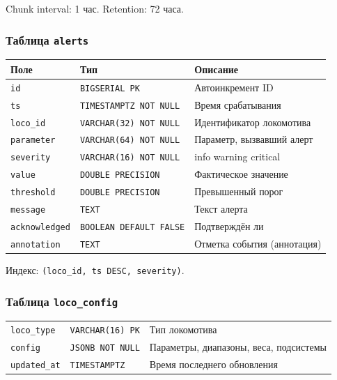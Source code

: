 \documentclass[12pt,a4paper]{article}
\newcommand{\code}[1]{\texttt{#1}}
\begin{document}
\vspace{0.3em}
\noindent Chunk interval: 1 час. Retention: 72 часа.

\subsubsection*{Таблица \code{alerts}}

\begin{tabularx}{\textwidth}{l l X}
\toprule
\textbf{Поле} & \textbf{Тип} & \textbf{Описание} \\
\midrule
\code{id} & \code{BIGSERIAL PK} & Автоинкремент ID \\
\code{ts} & \code{TIMESTAMPTZ NOT NULL} & Время срабатывания \\
\code{loco\_id} & \code{VARCHAR(32) NOT NULL} & Идентификатор локомотива \\
\code{parameter} & \code{VARCHAR(64) NOT NULL} & Параметр, вызвавший алерт \\
\code{severity} & \code{VARCHAR(16) NOT NULL} & info \textbar{} warning \textbar{} critical \\
\code{value} & \code{DOUBLE PRECISION} & Фактическое значение \\
\code{threshold} & \code{DOUBLE PRECISION} & Превышенный порог \\
\code{message} & \code{TEXT} & Текст алерта \\
\code{acknowledged} & \code{BOOLEAN DEFAULT FALSE} & Подтверждён ли \\
\code{annotation} & \code{TEXT} & Отметка события (аннотация) \\
\bottomrule
\end{tabularx}

\vspace{0.3em}
\noindent Индекс: \code{(loco\_id, ts DESC, severity)}.

\subsubsection*{Таблица \code{loco\_config}}

\begin{tabularx}{\textwidth}{l l X}
\toprule
\code{loco\_type} & \code{VARCHAR(16) PK} & Тип локомотива \\
\code{config} & \code{JSONB NOT NULL} & Параметры, диапазоны, веса, подсистемы \\
\code{updated\_at} & \code{TIMESTAMPTZ} & Время последнего обновления \\
\bottomrule
\end{tabularx}
\end{document}
